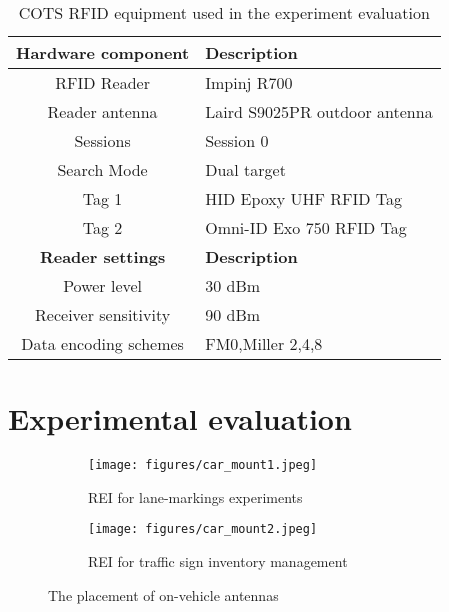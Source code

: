 \documentclass[lettersize,journal]{IEEEtran}
\begin{document}
\begin{table}[t]
	\caption{COTS RFID equipment used in the experiment evaluation}
		\begin{tabularx}{\columnwidth}{c|X}   
			\hline
			\textbf{Hardware component}&\textbf{Description} \\
			\hline
			\hline
			RFID Reader&Impinj R700  \\
			\hline
			Reader antenna&Laird S9025PR outdoor antenna \\
                \hline
			  Sessions&Session 0\\
                \hline
                Search Mode&Dual target\\
			\hline
			Tag 1&HID Epoxy UHF RFID Tag\\
                \hline
			Tag 2&Omni-ID Exo 750 RFID Tag\\
			\hline
                \hline
                \textbf{Reader settings}&\textbf{Description} \\
                \hline
			Power level&30 dBm \\
			\hline
			Receiver sensitivity&90 dBm \\
                \hline
                Data encoding schemes&FM0,Miller 2,4,8\\
			\hline
                
		
		 \end{tabularx}
		\label{tab:hardware}
\end{table}

\section{Experimental evaluation}

\begin{figure*}[tb!]
\centering
\begin{subfigure}{0.35\textwidth}
  \centering
  \texttt{[image: figures/car\_mount1.jpeg]}
  \caption{REI for lane-markings experiments}
  \label{fig:car_mount1}
\end{subfigure}
\begin{subfigure}{0.35\textwidth}
  \centering
  \texttt{[image: figures/car\_mount2.jpeg]}
  \caption{REI for traffic sign inventory management}
  \label{fig:car_mount2}
\end{subfigure}
\caption{The placement of on-vehicle antennas}
\label{fig:car_mounts}
\end{figure*}
\end{document}
